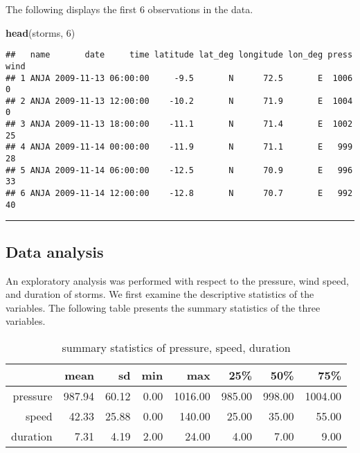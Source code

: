 \documentclass[]{article}
\newenvironment{Shaded}{\begin{snugshade}}{\end{snugshade}}
\newcommand{\KeywordTok}[1]{\textcolor[rgb]{0.13,0.29,0.53}{\textbf{{#1}}}}
\newcommand{\DecValTok}[1]{\textcolor[rgb]{0.00,0.00,0.81}{{#1}}}
\newcommand{\NormalTok}[1]{{#1}}
\begin{document}
The following displays the first 6 observations in the data.

\begin{Shaded}
\begin{Highlighting}[]
\KeywordTok{head}\NormalTok{(storms, }\DecValTok{6}\NormalTok{)}
\end{Highlighting}
\end{Shaded}

\begin{verbatim}
##   name       date     time latitude lat_deg longitude lon_deg press wind
## 1 ANJA 2009-11-13 06:00:00     -9.5       N      72.5       E  1006    0
## 2 ANJA 2009-11-13 12:00:00    -10.2       N      71.9       E  1004    0
## 3 ANJA 2009-11-13 18:00:00    -11.1       N      71.4       E  1002   25
## 4 ANJA 2009-11-14 00:00:00    -11.9       N      71.1       E   999   28
## 5 ANJA 2009-11-14 06:00:00    -12.5       N      70.9       E   996   33
## 6 ANJA 2009-11-14 12:00:00    -12.8       N      70.7       E   992   40
\end{verbatim}

\begin{center}\rule{0.5\linewidth}{\linethickness}\end{center}

\subsection{Data analysis}\label{data-analysis}

An exploratory analysis was performed with respect to the pressure, wind
speed, and duration of storms. We first examine the descriptive
statistics of the variables. The following table presents the summary
statistics of the three variables.

\begin{table}[ht]
\centering
\begin{tabular}{rrrrrrrr}
  \hline
 & mean & sd & min & max & 25\% & 50\% & 75\% \\ 
  \hline
pressure & 987.94 & 60.12 & 0.00 & 1016.00 & 985.00 & 998.00 & 1004.00 \\ 
  speed & 42.33 & 25.88 & 0.00 & 140.00 & 25.00 & 35.00 & 55.00 \\ 
  duration & 7.31 & 4.19 & 2.00 & 24.00 & 4.00 & 7.00 & 9.00 \\ 
   \hline
\end{tabular}
\caption{summary statistics of pressure, speed, duration} 
\end{table}
\end{document}
